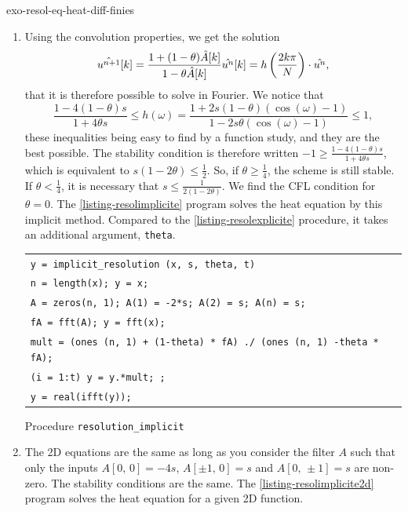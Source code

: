 \begin{correction}{exo-resol-eq-heat-diff-finies}
\begin{enumerate}
\item Using the convolution properties, we get the solution
\begin{equation*}
\hat{u^{n+1}}[k] = \frac{1+ (1- \theta) \hat{A}[k]}{1- \theta \hat{A}[k]} \hat{u^{n}}[k] = h \left(\frac{2k \pi}{N} \right) \cdot \hat{u^{n}},
\end{equation*}
that it is therefore possible to solve in Fourier. We notice that
\begin{equation*}
\frac{1-4 (1- \theta) s}{1 + 4 \theta s} \leq h (\omega) = \frac{1 + 2 s (1- \theta) (\cos (\omega) -1)}{1-2 s \theta (\cos (\omega) -1)} \leq 1,
\end{equation*}
these inequalities being easy to find by a function study, and they are the best possible. The stability condition is therefore written $ -1 \geq \frac{1-4 (1- \theta) s}{1 + 4 \theta s} $, which is equivalent to $ s (1-2 \theta ) \leq \frac{1}{2} $. So, if $ \theta \geq \frac{1}{4} $, the scheme is still stable. If $ \theta <\frac{1}{4} $, it is necessary that $ s \leq \frac{1}{2 (1-2 \theta)} $. We find the CFL condition for $ \theta = 0 $. The \Matlab{} \ref{listing-resolimplicite} program solves the heat equation by this implicit method. Compared to the \ref{listing-resolexplicite} procedure, it takes an additional argument, \texttt{theta}.

\begin{listing} \begin{footnotesize}
{\upshape
\begin{tabular}{l} \texttt{\pfunction y = implicit\_resolution (x, s, theta, t)} \\
\texttt{n = length(x); y = x;} \\
\texttt{A = zeros(n, 1); A(1) = -2*s; A(2) = s; A(n) = s;} \\
\texttt{fA = fft(A); y = fft(x);} \\
\texttt{mult = (ones (n, 1) + (1-theta) * fA) ./ (ones (n, 1) -theta * fA);} \\
\texttt{\pfor{}(i = 1:t) y = y.*mult; \pend{};} \\
\texttt{y = real(ifft(y));} \\
\end{tabular}
} 
\end{footnotesize}
\caption{Procedure \texttt{\upshape resolution\_implicit}}
\label{listing-resolimplicite}
\end{listing}
 
\item {} The 2D equations are the same as long as you consider the filter $ A $ such that only the inputs $ A [0, \, 0] = -4s $, $ A [\pm 1, \, 0] = s $ and $ A [0, \, \pm 1] = s $ are non-zero. The stability conditions are the same. The \Matlab{} \ref{listing-resolimplicite2d} program solves the heat equation for a given 2D function.


\end{enumerate}
\end{correction}
